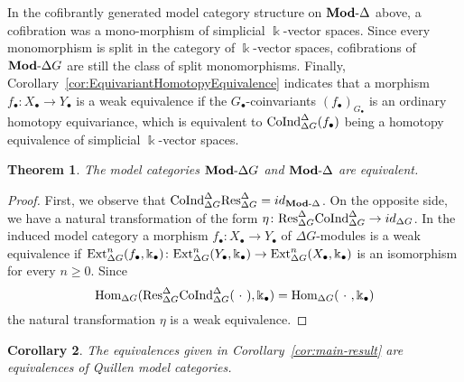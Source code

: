 \documentclass[a4paper,11pt]{amsart}
\newtheorem{theorem}{Theorem}[section]
\newtheorem{corollary}[theorem]{Corollary}
\theoremstyle{definition}
\newcommand{\rmod}[1]{\text{{\bf Mod}-}{#1}}
\newcommand{\Res}{\text{\rm Res}}
\newcommand{\Ext}{\text{\rm Ext}}
\newcommand{\Hom}{\text{\rm Hom}}
\newcommand{\CoInd}{\text{\rm CoInd}}
\newcommand{\Simp}{{\Delta}}
\begin{document}
In the cofibrantly generated model category structure on $\rmod{\Simp}$ above, a cofibration was a mono-morphism of simplicial  $\Bbbk$-vector spaces. Since every monomorphism is split in the category of $\Bbbk$-vector spaces, cofibrations of $\rmod{\Simp G} $ are still the class of split monomorphisms. Finally, Corollary~\ref{cor:EquivariantHomotopyEquivalence} indicates that a morphism $f_\bullet\colon X_\bullet\to Y_\bullet$ is a weak equivalence if the $G_\bullet$-coinvariants $(f_\bullet)_{G_\bullet}$ is an ordinary homotopy equivariance, which is equivalent to $\CoInd_{\Simp G}^\Simp(f_\bullet)$ being a homotopy equivalence of simplicial $\Bbbk$-vector spaces.

\begin{theorem}\label{thm:quillen-equivalence}
 The model categories $\rmod{\Simp G}$ and $\rmod{\Simp}$ are equivalent.   
\end{theorem}
\begin{proof}

First, we observe that $\CoInd^{\Simp}_{\Simp G}\Res^{\Simp}_{\Simp G} = id_{\rmod{\Simp}}$.  On the opposite side, we have a natural transformation of the form $\eta\colon\Res^{\Simp}_{\Simp G}\CoInd^{\Simp}_{\Simp G}\to id_{\Simp G}$. In the induced model category a morphism $f_\bullet\colon X_\bullet\to Y_\bullet$ of $\Simp G$-modules is a weak equivalence if $\Ext_{\Simp G}^n(f_\bullet, \Bbbk_\bullet)\colon \Ext_{\Simp G}^n(Y_\bullet,\Bbbk_\bullet)\to \Ext_{\Simp G}^n(X_\bullet, \Bbbk_\bullet)$ is an isomorphism for every $n\geq 0$. Since
\[ \Hom_{\Simp G}(\Res^{\Simp}_{\Simp G}\CoInd^{\Simp}_{\Simp G}(\ \cdot\ ), \Bbbk_\bullet) = \Hom_{\Simp G}(\ \cdot\ ,\Bbbk_\bullet) \]
the natural transformation $\eta$  is a weak equivalence.
\end{proof}

\begin{corollary}
    The equivalences given in Corollary~\ref{cor:main-result} are equivalences of Quillen model categories.
\end{corollary}



\end{document}
